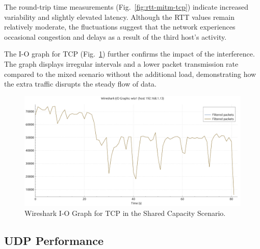 \begin{enumerate}
                The round-trip time measurements (Fig.~\ref{fig:rtt-mitm-tcp}) indicate increased variability and slightly elevated latency. 
                Although the RTT values remain relatively moderate, the fluctuations suggest that the network experiences occasional congestion and delays as a result of the third host's activity.


                The I-O graph for TCP (Fig.~\ref{fig:io-mitm-tcp}) further confirms the impact of the interference. 
                The graph displays irregular intervals and a lower packet transmission rate compared to the mixed scenario without the additional load, demonstrating how the extra traffic disrupts the steady flow of data.

                \begin{figure}[ht]
                    \centering
                    \includegraphics[width=0.9\columnwidth]{images/graphs/I-O/I-O_MIX_MITM_TCP.pdf}
                    \caption{Wireshark I-O Graph for TCP in the Shared Capacity Scenario.}
                    \label{fig:io-mitm-tcp}
                \end{figure}

        \end{enumerate}

    \subsection{UDP Performance} \label{subsec:udp-performance}

